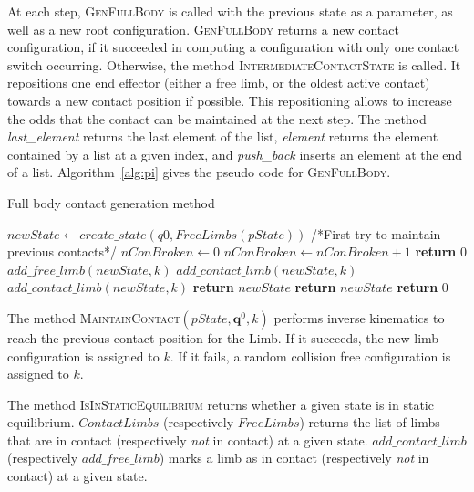At each step, \textsc{GenFullBody} is called with the previous state as a parameter, as well
as a new root configuration. \textsc{GenFullBody} returns a new contact configuration, if it succeeded
in computing a configuration with only one contact switch occurring.
Otherwise, the method \textsc{IntermediateContactState} is called.
It repositions one end effector (either a free limb, or the oldest active contact) towards a new contact position if possible.
This repositioning allows to increase the odds that the contact can be maintained at the next step.
The method \textit{last\_element} returns the last element
of the list, \textit{element} returns the element contained by a list at a given index, and \textit{push\_back} inserts an element at the end of a list.
Algorithm~\ref{alg:pi} gives the pseudo code for \textsc{GenFullBody}.

\begin{algorithm}[!tbp]
\caption{Full body contact generation method} \label{interpolate}
	\begin{algorithmic}[1]
		\State $newState \gets create\_state(q0, FreeLimbs(pState))$
		\State /*First try to maintain previous contacts*/
		\State $nConBroken \gets 0$
				\State $nConBroken \gets nConBroken +1$
					\State \textbf{return} $0$
				\EndIf				
				\State $add\_free\_limb(newState,k)$
			\Else 					
				\State $add\_contact\_limb(newState,k)$
			\EndIf
		\EndFor
				\State $add\_contact\_limb(newState,k)$
				\State \textbf{return} $newState$
			\EndIf
		\EndFor
			\State \textbf{return} $newState$
		\Else
			\State \textbf{return} $0$
		\EndIf
	\EndFunction
\end{algorithmic}
\label{alg:pi}
\end{algorithm}

The method \textsc{MaintainContact}$(pState,\mathbf{q}^0,k)$ performs inverse kinematics to reach the previous contact position for the Limb.
If it succeeds, the new limb configuration is assigned to $k$. If it fails, a random collision free configuration is assigned to $k$.

The method \textsc{IsInStaticEquilibrium} returns whether a given state is in static equilibrium.
$ContactLimbs$ (respectively $FreeLimbs$) returns the list of limbs that are in contact (respectively \textit{not} in contact) at a given state. $add\_contact\_limb$ (respectively $add\_free\_limb$)  marks a limb as in contact (respectively \textit{not} in contact) at a given state.

